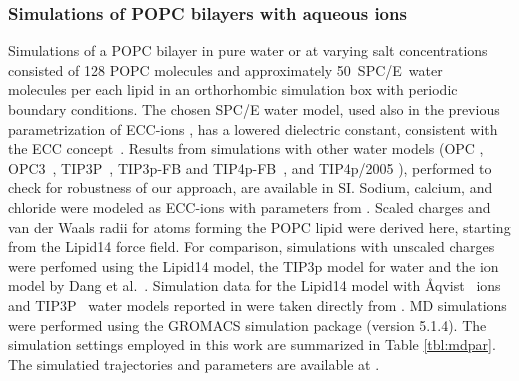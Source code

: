 \documentclass[aip,jcp,twocolumn]{revtex4}
\begin{document}
\subsubsection{Simulations of POPC bilayers with aqueous ions}
Simulations of a POPC bilayer in pure water or at varying salt concentrations
consisted of 128 POPC molecules and approximately 50~SPC/E~water~\cite{Berendsen1987} molecules per each lipid
in an orthorhombic simulation box with periodic boundary conditions. 
The chosen SPC/E water model, used also in the previous parametrization of 
ECC-ions \cite{jungwirth17-new-paper-to-be-published, kohagen16, Pluharova2014},
has a lowered dielectric constant, consistent with the ECC concept~\cite{leontyev11, leontyev14}.
Results from simulations with other water models 
(OPC \cite{Izadi14}, OPC3~\cite{Izadi16}, 
TIP3P~\cite{jorgensen83},
TIP3p-FB and TIP4p-FB~\cite{Wang2014},
and TIP4p/2005 \cite{Abascal2005}), performed to check for robustness of our approach, are available in SI.
Sodium, calcium, and chloride 
were modeled as ECC-ions with parameters from .  %
Scaled charges and van der Waals radii for atoms forming the POPC lipid were derived here, starting from the Lipid14 force field.
For comparison, simulations with unscaled charges were perfomed using the Lipid14 model, the TIP3p model for water \cite{jorgensen83} and the ion model by
Dang et al.~\cite{smith94,chang1999,dang2006}.
Simulation data for the Lipid14 model with \AA{}qvist~\cite{aqvist90} ions and TIP3P~\cite{jorgensen83}
water models reported in \cite{catte16} 
were taken directly from \cite{lipid14POPC0mMNaClfiles,lipid14POPC350mMCaClfiles,lipid14POPC350mMCaClfilesNC,lipid14POPC1000mMNaClfiles}. 
MD simulations were performed using the GROMACS \cite{Abraham15} simulation package (version 5.1.4).  
The simulation settings employed in this work are 
summarized in Table \ref{tbl:mdpar}. 
The simulatied trajectories and parameters are available at \cite{??} . 
\end{document}
